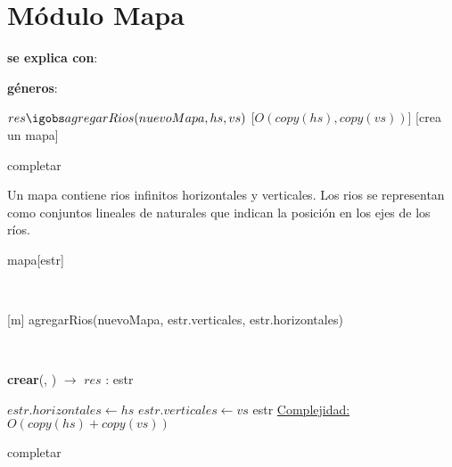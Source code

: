 \documentclass[10pt, a4paper]{article}
\newcommand{\completar}{{\color{orange}completar}}
\begin{document}
\section{Módulo Mapa}

\begin{Interfaz}
  
  \textbf{se explica con}: 

  \textbf{géneros}: 


    {$res \igobs agregarRios(nuevoMapa, hs, vs)$}%
    [$O(copy(hs), copy(vs))$]
  [crea un mapa]

    \completar

\end{Interfaz}

\begin{Representacion}
  

  Un mapa contiene rios infinitos horizontales y verticales. Los rios se
  representan como conjuntos lineales de naturales que indican la posición en
  los ejes de los ríos.

  \begin{Estructura}{mapa}[estr]
    \begin{Tupla}[estr]
    \end{Tupla}

  \end{Estructura}
  

    ~ 

  [m]{
      agregarRios(nuevoMapa, estr.verticales, estr.horizontales)
  }

\end{Representacion}

~

\begin{Algoritmos}

\begin{algorithm}[H]{\textbf{crear}(, ) $\to$ $res$ : estr}
\begin{algorithmic}[1]
    \State $estr.horizontales \gets hs$
    \State $estr.verticales \gets vs$
    \State \Return estr
    \medskip
    \Statex \underline{Complejidad:} $O(copy(hs) + copy(vs))$
\end{algorithmic}
\end{algorithm}

\completar
  
\end{Algoritmos}
\end{document}
